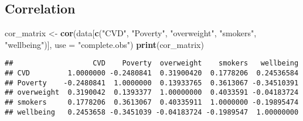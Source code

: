 \documentclass[
]{article}
\newenvironment{Shaded}{\begin{snugshade}}{\end{snugshade}}
\newcommand{\AttributeTok}[1]{\textcolor[rgb]{0.13,0.29,0.53}{#1}}
\newcommand{\FunctionTok}[1]{\textcolor[rgb]{0.13,0.29,0.53}{\textbf{#1}}}
\newcommand{\NormalTok}[1]{#1}
\newcommand{\OtherTok}[1]{\textcolor[rgb]{0.56,0.35,0.01}{#1}}
\newcommand{\StringTok}[1]{\textcolor[rgb]{0.31,0.60,0.02}{#1}}
\begin{document}
\subsection{Correlation}\label{correlation}

\begin{Shaded}
\begin{Highlighting}[]
\NormalTok{cor\_matrix }\OtherTok{\textless{}{-}} \FunctionTok{cor}\NormalTok{(data[}\FunctionTok{c}\NormalTok{(}\StringTok{"CVD"}\NormalTok{, }\StringTok{"Poverty"}\NormalTok{, }\StringTok{"overweight"}\NormalTok{, }\StringTok{"smokers"}\NormalTok{, }\StringTok{"wellbeing"}\NormalTok{)], }
                  \AttributeTok{use =} \StringTok{"complete.obs"}\NormalTok{)}
\FunctionTok{print}\NormalTok{(cor\_matrix)}
\end{Highlighting}
\end{Shaded}

\begin{verbatim}
##                   CVD    Poverty  overweight    smokers   wellbeing
## CVD         1.0000000 -0.2480841  0.31900420  0.1778206  0.24536584
## Poverty    -0.2480841  1.0000000  0.13933765  0.3613067 -0.34510391
## overweight  0.3190042  0.1393377  1.00000000  0.4033591 -0.04183724
## smokers     0.1778206  0.3613067  0.40335911  1.0000000 -0.19895474
## wellbeing   0.2453658 -0.3451039 -0.04183724 -0.1989547  1.00000000
\end{verbatim}
\end{document}
